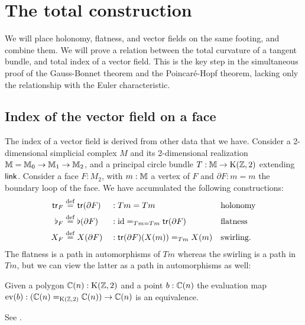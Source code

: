 \section{The total construction}
\label{sec:totals}
We will place holonomy, flatness, and vector fields on the same footing, and combine them. We will prove a relation between the total curvature of a tangent bundle, and total index of a vector field. This is the key step in the simultaneous proof of the Gauss-Bonnet theorem and the Poincaré-Hopf theorem, lacking only the relationship with the Euler characteristic.

\subsection{Index of the vector field on a face}
The index of a vector field is derived from other data that we have. Consider a 2-dimensional simplicial complex \( M \) and its 2-dimensional realization \( \mathbb{M}=\mathbb{M}_0\to\mathbb{M}_1\to\mathbb{M}_2 \), and a principal circle bundle \( T:\mathbb{M}\to\mathrm{K}(\mathbb{Z},2) \) extending \( \operatorname{\mathsf{link}} \). Consider a face \( F:M_2 \), with \( m:\mathbb{M} \) a vertex of \( F \) and \( \partial F:m=m \) the boundary loop of the face. We have accumulated the following constructions:
\[\begin{aligned}
\mathsf{tr}_F&\stackrel{\mathrm{def}}{=} \mathsf{tr}(\partial F)&&:Tm=Tm&&\text{holonomy}\\
\flat_F&\stackrel{\mathrm{def}}{=} \flat(\partial F)&&:\text{id}=_{Tm=Tm}\mathsf{tr}(\partial F)&&\text{flatness}\\
X_F&\stackrel{\mathrm{def}}{=} X(\partial F)&&:\mathsf{tr}(\partial F)(X(m))=_{Tm}X(m)&&\text{swirling.}\\
\end{aligned}\]
The flatness is a path in automorphisms of \( Tm \) whereas the swirling is a path in \( Tm \), but we can view the latter as a path in automorphisms as well:
\begin{myprop}
\label{prop:eveq}
Given a polygon \( \mathbb{C}(n):\mathrm{K}(\mathbb{Z},2) \) and a point \( b:\mathbb{C}(n) \) the evaluation map \( \mathrm{ev}(b):(\mathbb{C}(n)=_{\mathrm{K}(\mathbb{Z},2)}\mathbb{C}(n))\to \mathbb{C}(n) \) is an equivalence.
\end{myprop}
\begin{myproof}
See \cite{buchholtz2023central}.
\end{myproof}

